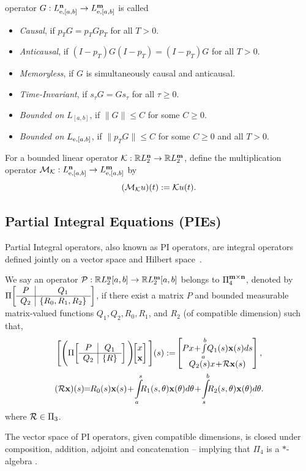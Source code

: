 operator $G:L_{{\mathrm{e}},[a,b]}^{\mathbf{n}}\to
L_{{\mathrm{e}},[a,b]}^{\mathbf{m}}$ is called
\begin{itemize}
\item \emph{Causal}, if $p_TG=p_TGp_T$ for all $T>0$.
\item \emph{Anticausal}, if $(I-p_T)G(I-p_T)=(I-p_T)G$ for all $T>0$.
\item \emph{Memoryless}, if $G$ is simultaneously causal and anticausal.
\item \emph{Time-Invariant}, if $s_\tau G = G s_\tau$ for all $\tau\geq0$.
\item \emph{Bounded on $L_{[a,b]}$}, if $\|G\|\leq C$ for some $C\geq0$.
\item \emph{Bounded on $L_{{\mathrm{e}},[a,b]}$}, if
$\|p_TG\|\leq C$ for some $C\geq0$ and all $T>0$.
\end{itemize}
For a bounded linear operator
$\mathcal{K}:\mathbb{R} L_2^{\mathbf{n}}\to\mathbb{R} L_2^{\mathbf{m}}$, define the multiplication operator
$\mathcal{M}_{\mathcal{K}}:L_{{\mathrm{e}},[a,b]}^{\mathbf{n}}
\to L_{{\mathrm{e}},[a,b]}^{\mathbf{m}}$ by
\[
(\mathcal{M}_{\mathcal{K}}u)(t):=\mathcal{K} u(t).
\]

\subsection{Partial Integral Equations (PIEs)}
Partial Integral operators, also known as PI operators, are integral operators
defined jointly on a vector space and Hilbert
space~\cite{peet2021pierepresentation,shivakumar2024GDPE}.
\begin{definition}
We say an operator $\mathcal{P}:\mathbb{R} L_2^{\mathbf{n}}[a,b]\to\mathbb{R} L_2^{\mathbf{m}}[a,b]$
belongs to ${\Pi}_4^{\mathbf{m}\times\mathbf{n}}$, denoted by
$\Pi\!\left[ \begin{array}{c|c} P & Q_1\\ \hline Q_2 & \{R_0,R_1,R_2\} \end{array} \right]$, if there exist a matrix $P$ and bounded measurable matrix-valued functions $Q_1, Q_2,
R_0, R_1$, and $R_2$ (of compatible dimension) such that,
\begin{gather*}
\Bigg[\Bigg(\PIop{P}{Q_1}{Q_2}{\{R\}}\Bigg)\! \!
\bmat{x \\ \mbf{x}}\Bigg](s):=\! \bmat{Px\!
+\!\int\limits_a^b\!Q_1(s)\mbf x(s)ds\\Q_2(s)x\!+\!\mcl R \mbf x(s)},\\ 
(\mcl R \mbf x)(s)\!\! =\!\! R_0(s)\mbf x(s)\! +\! \int\limits_a^s\!\!\!R_1(s,\theta)\mbf x(\theta)d\theta\! +\!\int\limits_s^b\!\!\!R_2(s,\theta)\mbf x(\theta) d\theta.
\end{gather*}
where $\mathcal{R}\in\Pi_3$.
\end{definition}
The vector space of PI operators, given compatible dimensions, is closed under
composition, addition, adjoint and concatenation -- implying that ${\Pi}_4$ is a
$*$-algebra \cite{shivakumar2024GDPE}.

